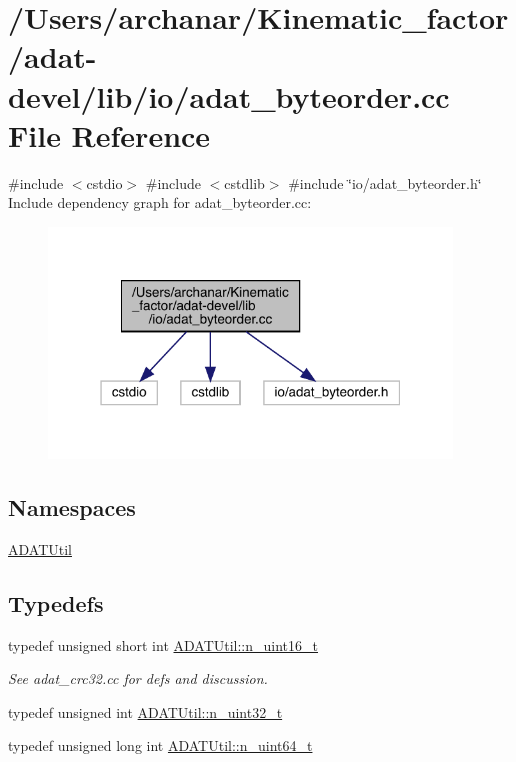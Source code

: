 \hypertarget{adat-devel_2lib_2io_2adat__byteorder_8cc}{}\section{/\+Users/archanar/\+Kinematic\+\_\+factor/adat-\/devel/lib/io/adat\+\_\+byteorder.cc File Reference}
\label{adat-devel_2lib_2io_2adat__byteorder_8cc}
{\ttfamily \#include $<$cstdio$>$}\newline
{\ttfamily \#include $<$cstdlib$>$}\newline
{\ttfamily \#include \char`\"{}io/adat\+\_\+byteorder.\+h\char`\"{}}\newline
Include dependency graph for adat\+\_\+byteorder.\+cc\+:
\nopagebreak
\begin{figure}[H]
\begin{center}
\leavevmode
\includegraphics[width=304pt]{dd/d4f/adat-devel_2lib_2io_2adat__byteorder_8cc__incl}
\end{center}
\end{figure}
\subsection*{Namespaces}
\begin{DoxyCompactItemize}
\item 
 \mbox{\hyperlink{namespaceADATUtil}{A\+D\+A\+T\+Util}}
\end{DoxyCompactItemize}
\subsection*{Typedefs}
\begin{DoxyCompactItemize}
\item 
typedef unsigned short int \mbox{\hyperlink{namespaceADATUtil_a8e184fda37156fed1e06319a0051e987}{A\+D\+A\+T\+Util\+::n\+\_\+uint16\+\_\+t}}
\begin{DoxyCompactList}\small\item\em See adat\+\_\+crc32.\+cc for defs and discussion. \end{DoxyCompactList}\item 
typedef unsigned int \mbox{\hyperlink{namespaceADATUtil_ad945a8afa4db2d1f89b731964adae97e}{A\+D\+A\+T\+Util\+::n\+\_\+uint32\+\_\+t}}
\item 
typedef unsigned long int \mbox{\hyperlink{namespaceADATUtil_afbd9ee3146133429698be74bcf422bd8}{A\+D\+A\+T\+Util\+::n\+\_\+uint64\+\_\+t}}
\end{DoxyCompactItemize}
